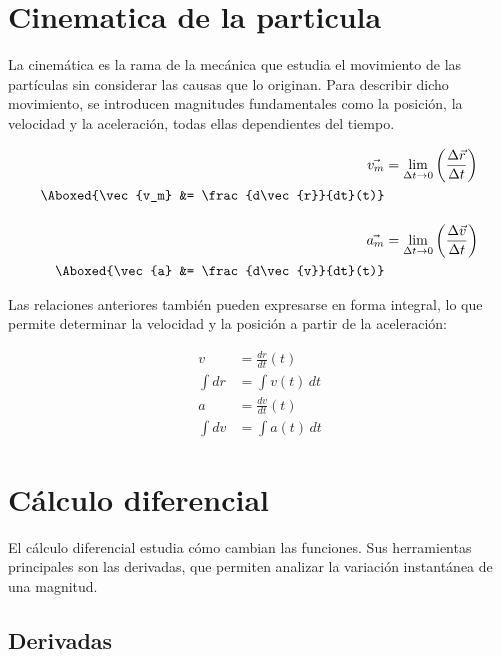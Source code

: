 
\section{Cinematica de la particula}

La cinemática es la rama de la mecánica que estudia el movimiento de las partículas sin considerar las causas que lo originan. Para describir dicho movimiento, se introducen magnitudes fundamentales como la posición, la velocidad y la aceleración, todas ellas dependientes del tiempo.
\vspace{-20pt}

\begin{align*}
\vec{v_m} &= \lim_{\Delta t \to 0} \left(\frac{\Delta \vec{r}}{\Delta t}\right)\\
\Aboxed{\vec{v_m} &= \frac{d\vec{r}}{dt}(t)}\\[10pt]
\vec{a_m} &= \lim_{\Delta t \to 0} \left(\frac{\Delta \vec{v}}{\Delta t}\right)\\
\Aboxed{\vec{a} &= \frac{d\vec{v}}{dt}(t)}
\end{align*}

Las relaciones anteriores también pueden expresarse en forma integral, lo que permite determinar la velocidad y la posición a partir de la aceleración:

\vspace{-20pt}

\begin{align*}
v &= \frac{dr}{dt}(t) \\
\int dr &= \int v(t)\, dt \\
a &= \frac{dv}{dt}(t) \\
\int dv &= \int a(t)\, dt
\end{align*}


\section{Cálculo diferencial}

El cálculo diferencial estudia cómo cambian las funciones. Sus herramientas principales son las derivadas, que permiten analizar la variación instantánea de una magnitud.

\subsection{Derivadas}


